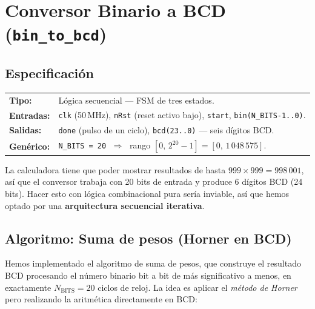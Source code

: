 \documentclass[memoria_final]{subfiles}
\begin{document}
	\FloatBarrier
	
	\section{Conversor Binario a BCD (\texttt{bin\_to\_bcd})}
	
	\subsection{Especificación}
	
	\begin{tcolorbox}[colback=SoftGreen, colframe=MainGreen, boxrule=0.8pt, arc=2pt,
		left=0.5cm, right=0.5cm, top=0.3cm, bottom=0.3cm]
		\small
		\begin{tabular}{ll}
			\textbf{Tipo:}      & Lógica secuencial --- FSM de tres estados.\\[3pt]
			\textbf{Entradas:}  & \texttt{clk} (50\,MHz), \texttt{nRst} (reset activo bajo),
			\texttt{start}, \texttt{bin(N\_BITS-1..0)}.\\[3pt]
			\textbf{Salidas:}   & \texttt{done} (pulso de un ciclo),
			\texttt{bcd(23..0)} --- seis dígitos BCD.\\[3pt]
			\textbf{Genérico:}  & \texttt{N\_BITS = 20} $\;\Rightarrow\;$
			rango $\left[0,\, 2^{20}-1\right] = \left[0,\,1\,048\,575\right]$.
		\end{tabular}
	\end{tcolorbox}
	
	\vspace{0.4em}
	La calculadora tiene que poder mostrar resultados de hasta $999 \times 999 = 998\,001$, así que el conversor trabaja con 20 bits de entrada y produce 6 dígitos BCD (24 bits). Hacer esto con lógica combinacional pura sería inviable, así que hemos optado por una \textbf{arquitectura secuencial iterativa}.
	
	\subsection{Algoritmo: Suma de pesos (Horner en BCD)}

	Hemos implementado el algoritmo de suma de pesos, que construye el resultado BCD
	procesando el número binario bit a bit de más significativo a menos, en exactamente
	$N_{\text{BITS}} = 20$ ciclos de reloj. La idea es aplicar el \textit{método de Horner}
	pero realizando la aritmética directamente en BCD:
\end{document}
